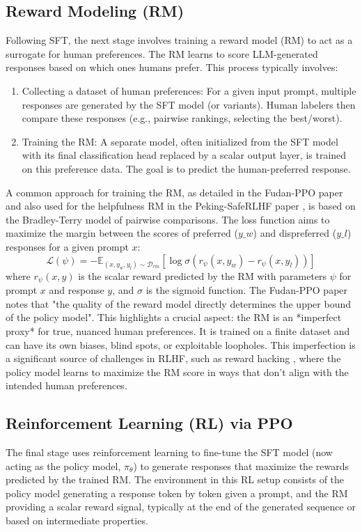 \documentclass{article} %
\begin{document}
\subsection{Reward Modeling (RM)}
Following SFT, the next stage involves training a reward model (RM) to act as a surrogate for human preferences. The RM learns to score LLM-generated responses based on which ones humans prefer. This process typically involves:
\begin{enumerate}
    \item Collecting a dataset of human preferences: For a given input prompt, multiple responses are generated by the SFT model (or variants). Human labelers then compare these responses (e.g., pairwise rankings, selecting the best/worst). \cite{Zheng2023PPO}
    \item Training the RM: A separate model, often initialized from the SFT model with its final classification head replaced by a scalar output layer, is trained on this preference data. The goal is to predict the human-preferred response.
\end{enumerate}
A common approach for training the RM, as detailed in the Fudan-PPO paper \cite{Zheng2023PPO} and also used for the helpfulness RM in the Peking-SafeRLHF paper \cite{Dai2023SafeRLHF}, is based on the Bradley-Terry model of pairwise comparisons. The loss function aims to maximize the margin between the scores of preferred ($y\_w$) and dispreferred ($y\_l$) responses for a given prompt $x$:
$$ \mathcal{L}(\psi) = -\mathbb{E}_{(x,y_w,y_l)\sim\mathcal{D}_{rm}}[\log \sigma(r_\psi(x,y_w) - r_\psi(x,y_l))] $$
where $r_\psi(x,y)$ is the scalar reward predicted by the RM with parameters $\psi$ for prompt $x$ and response $y$, and $\sigma$ is the sigmoid function. The Fudan-PPO paper notes that "the quality of the reward model directly determines the upper bound of the policy model". \cite{Zheng2023PPO} This highlights a crucial aspect: the RM is an *imperfect proxy* for true, nuanced human preferences. It is trained on a finite dataset and can have its own biases, blind spots, or exploitable loopholes. This imperfection is a significant source of challenges in RLHF, such as reward hacking \cite{Zhang2024EnergyLoss}, where the policy model learns to maximize the RM score in ways that don't align with the intended human preferences.

\subsection{Reinforcement Learning (RL) via PPO}
The final stage uses reinforcement learning to fine-tune the SFT model (now acting as the policy model, $\pi_\theta$) to generate responses that maximize the rewards predicted by the trained RM. The environment in this RL setup consists of the policy model generating a response token by token given a prompt, and the RM providing a scalar reward signal, typically at the end of the generated sequence or based on intermediate properties.
\end{document}
